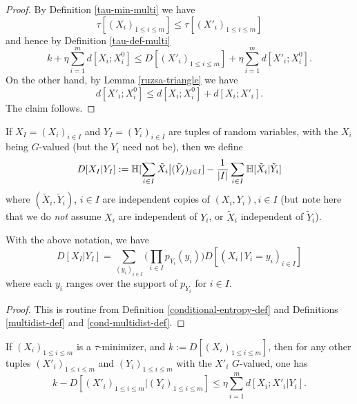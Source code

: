 \begin{proof}
  By Definition \ref{tau-min-multi} we have
  $$ \tau[ (X_i)_{1 \leq i \leq m}] \leq \tau[ (X'_i)_{1 \leq i \leq m}]$$
  and hence by Definition \ref{tau-def-multi}
  $$ k + \eta \sum_{i=1}^m d[X_i; X^0_i] \leq D[(X'_i)_{1 \leq i \leq m}] + \eta \sum_{i=1}^m d[X'_i; X^0_i].$$
  On the other hand, by Lemma \ref{ruzsa-triangle} we have
  $$ d[X'_i; X^0_i] \leq d[X_i; X^0_i] + d[X_i; X'_i].$$
  The claim follows.
\end{proof}

\begin{definition}\label{cond-multidist-def} If $X_I = (X_i)_{i \in I}$ and $Y_I = (Y_i)_{i \in I}$ are tuples of random variables, with the $X_i$ being $G$-valued (but the $Y_i$ need not be), then we define
  \begin{equation}\label{multi-def-cond}
  D[ X_{I} | Y_{I}] := \mathbb{H}[\sum_{i \in I} \tilde X_i \big| (\tilde Y_j)_{j \in I} ] - \frac{1}{|I|} \sum_{i \in I} \mathbb{H}[ \tilde X_i | \tilde Y_i]
    \end{equation}
  where $(\tilde X_i,\tilde Y_i)$, $i \in I$ are independent copies of $(X_i,Y_i), i \in I$ (but note here that we do \emph{not} assume $X_i$ are independent of $Y_i$, or $\tilde X_i$ independent of $\tilde Y_i$).
\end{definition}

\begin{lemma}\label{cond-multidist-alt}  With the above notation, we have
  \begin{equation}\label{multi-def-cond-alt}
    D[ X_{I} | Y_{I} ] = \sum_{(y_i)_{i \in I}} \biggl(\prod_{i \in I} p_{Y_i}(y_i)\biggr) D[ (X_i \,|\, Y_i \mathop{=}y_i)_{i \in I}]
  \end{equation}
  where each $y_i$ ranges over the support of $p_{Y_i}$ for $i \in I$.
\end{lemma}

\begin{proof}
  This is routine from Definition \ref{conditional-entropy-def} and Definitions \ref{multidist-def} and \ref{cond-multidist-def}.
\end{proof}

\begin{lemma}\label{cond-multidist-lower}  If  $(X_i)_{1 \leq i \leq m}$ is a $\tau$-minimizer, and $k := D[(X_i)_{1 \leq i \leq m}]$, then for any other tuples $(X'_i)_{1 \leq i \leq m}$ and $(Y_i)_{1 \leq i \leq m}$ with the $X'_i$ $G$-valued, one has
  $$ k - D[(X'_i)_{1 \leq i \leq m} | (Y_i)_{1 \leq i \leq m}] \leq \eta \sum_{i=1}^m d[X_i; X'_i|Y_i].$$
\end{lemma}

